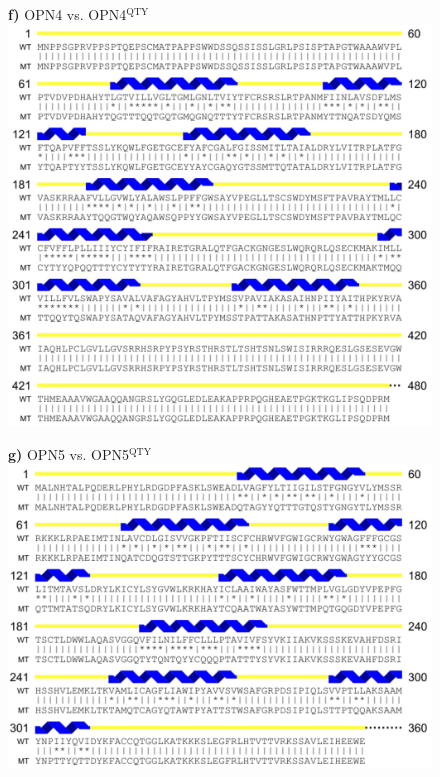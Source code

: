 \documentclass[fleqn,12pt]{supp}
\begin{document}
\newpage
\begin{figure}[H]
    \textbf{f)} OPN4 vs. OPN4$^{\textrm{QTY}}$ \\
    \includegraphics[width=\linewidth]{SuppFigures/opn4.jpg}
\end{figure}

\newpage
\begin{figure}[H]
    \textbf{g)} OPN5 vs. OPN5$^{\textrm{QTY}}$ \\
    \includegraphics[width=\linewidth]{SuppFigures/opn5.jpg}
\end{figure}
\end{document}
